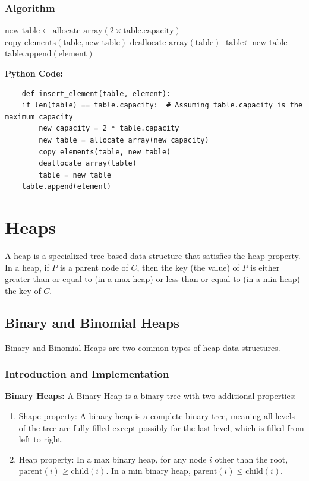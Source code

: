 \documentclass[12pt]{book} %
\begin{document}
\subsubsection{Algorithm}
\begin{algorithm}
\caption{Insert Element into Dynamic Table}
\begin{algorithmic}[1]
        \State $\text{new\_table} \gets \text{allocate\_array}(2 \times \text{table.capacity})$
        \State $\text{copy\_elements}(\text{table}, \text{new\_table})$
        \State $\text{deallocate\_array}(\text{table})$
        \State $\text{table} \gets \text{new\_table}$
    \EndIf
    \State $\text{table.append}(\text{element})$
\EndFunction
\end{algorithmic}
\end{algorithm}
\FloatBarrier
\textbf{Python Code:}
\FloatBarrier
\begin{lstlisting}
    def insert_element(table, element):
    if len(table) == table.capacity:  # Assuming table.capacity is the maximum capacity
        new_capacity = 2 * table.capacity
        new_table = allocate_array(new_capacity)
        copy_elements(table, new_table)
        deallocate_array(table)
        table = new_table
    table.append(element)
\end{lstlisting}

\section{Heaps}
A heap is a specialized tree-based data structure that satisfies the heap property. In a heap, if \( P \) is a parent node of \( C \), then the key (the value) of \( P \) is either greater than or equal to (in a max heap) or less than or equal to (in a min heap) the key of \( C \). 

\subsection{Binary and Binomial Heaps}
Binary and Binomial Heaps are two common types of heap data structures.

\subsubsection{Introduction and Implementation}

\textbf{Binary Heaps:}
A Binary Heap is a binary tree with two additional properties:
\begin{enumerate}
    \item Shape property: A binary heap is a complete binary tree, meaning all levels of the tree are fully filled except possibly for the last level, which is filled from left to right.
    \item Heap property: In a max binary heap, for any node \( i \) other than the root, \( \text{parent}(i) \geq \text{child}(i) \). In a min binary heap, \( \text{parent}(i) \leq \text{child}(i) \).
\end{enumerate}
\end{document}
